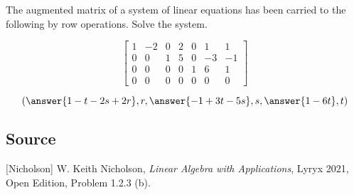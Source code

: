 \documentclass{ximera}
\author{}
\begin{document}
\begin{exercise}
The augmented matrix of a system of linear equations has been carried to the following by row operations.  Solve the system.

$$\left[\begin{array}{cccccc|c} 
 1 & -2 & 0 & 2 & 0 & 1 & 1\\
 0 & 0 & 1 & 5 & 0 & -3 & -1\\
 0 & 0 & 0 & 0 & 1 & 6 & 1\\
 0 & 0 & 0 & 0 & 0 & 0 & 0
 \end{array}\right]$$

 $$(\answer{1-t-2s+2r}, r, \answer{-1+3t-5s}, s,\answer{1-6t}, t)$$
\end{exercise}

\subsection*{Source}
[Nicholson] W. Keith Nicholson, {\it Linear Algebra with Applications}, Lyryx 2021, Open Edition, Problem 1.2.3 (b).
\end{document}
